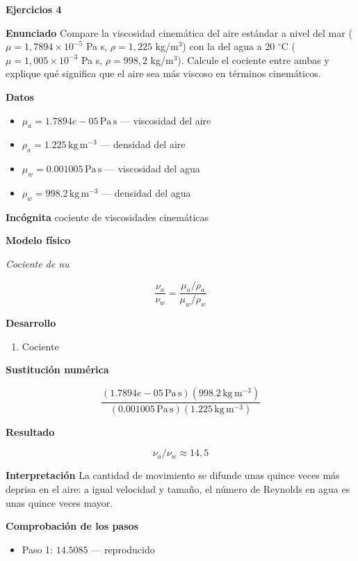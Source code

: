 \documentclass[10pt,openany]{book}
\begin{document}
\noindent\textbf{Ejercicios 4}

\noindent\textbf{Enunciado}
Compare la viscosidad cinemática del aire estándar a nivel del mar (\(\mu = 1{,}7894\times 10^{-5}\) Pa s, \(\rho = 1{,}225\) kg/m\(^3\)) con la del agua a 20 \(^\circ\)C (\(\mu = 1{,}005\times 10^{-3}\) Pa s, \(\rho = 998{,}2\) kg/m\(^3\)). Calcule el cociente entre ambas y explique qué significa que el aire sea más viscoso en términos cinemáticos.

\noindent\textbf{Datos}
\begin{itemize}
\item $\mu_{a} = 1.7894e-05\,\mathrm{Pa}\,\mathrm{s}$ — viscosidad del aire
\item $\rho_{a} = 1.225\,\mathrm{kg}\,\mathrm{m}^{-3}$ — densidad del aire
\item $\mu_{w} = 0.001005\,\mathrm{Pa}\,\mathrm{s}$ — viscosidad del agua
\item $\rho_{w} = 998.2\,\mathrm{kg}\,\mathrm{m}^{-3}$ — densidad del agua
\end{itemize}

\noindent\textbf{Incógnita}
cociente de viscosidades cinemáticas

\noindent\textbf{Modelo físico}

\noindent\textit{Cociente de nu}

\[
\frac{\nu_a}{\nu_w} = \frac{\mu_a/\rho_a}{\mu_w/\rho_w}
\]

\noindent\textbf{Desarrollo}
\begin{enumerate}
\item
Cociente
\end{enumerate}

\noindent\textbf{Sustitución numérica}

\[
\frac{\left(1.7894e-05\,\mathrm{Pa}\,\mathrm{s}\right) \left(998.2\,\mathrm{kg}\,\mathrm{m}^{-3}\right)}{\left(0.001005\,\mathrm{Pa}\,\mathrm{s}\right) \left(1.225\,\mathrm{kg}\,\mathrm{m}^{-3}\right)}
\]

\noindent\textbf{Resultado}

\[
\nu_a/\nu_w \approx 14{,}5
\]

\noindent\textbf{Interpretación}
La cantidad de movimiento se difunde unas quince veces más deprisa en el aire: a igual velocidad y tamaño, el número de Reynolds en agua es unas quince veces mayor.

\noindent\textbf{Comprobación de los pasos}
\begin{itemize}
\item Paso 1: $14.5085$ — reproducido
\end{itemize}
\end{document}
